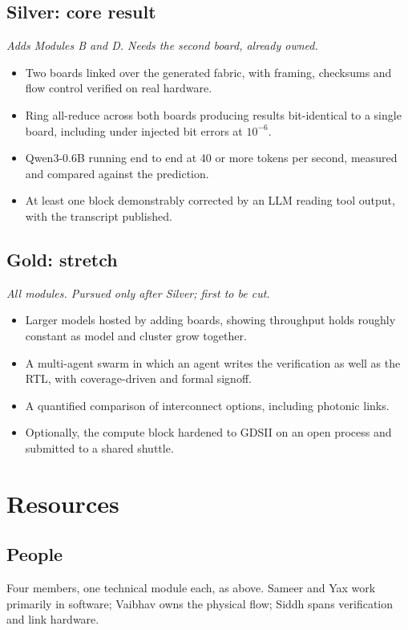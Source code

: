 \documentclass[conference,10pt]{IEEEtran}
\begin{document}
\subsection{Silver: core result}
\emph{Adds Modules B and D. Needs the second board, already owned.}
\begin{itemize}\itemsep1pt \parskip0pt
\item Two boards linked over the generated fabric, with framing, checksums and
flow control verified on real hardware.
\item Ring all-reduce across both boards producing results bit-identical to a
single board, including under injected bit errors at $10^{-6}$.
\item Qwen3-0.6B running end to end at 40 or more tokens per second, measured and
compared against the prediction.
\item At least one block demonstrably corrected by an LLM reading tool output,
with the transcript published.
\end{itemize}

\subsection{Gold: stretch}
\emph{All modules. Pursued only after Silver; first to be cut.}
\begin{itemize}\itemsep1pt \parskip0pt
\item Larger models hosted by adding boards, showing throughput holds roughly
constant as model and cluster grow together.
\item A multi-agent swarm in which an agent writes the verification as well as the
RTL, with coverage-driven and formal signoff.
\item A quantified comparison of interconnect options, including photonic links.
\item Optionally, the compute block hardened to GDSII on an open process and
submitted to a shared shuttle.
\end{itemize}

\section{Resources}
\subsection{People}
Four members, one technical module each, as above. Sameer and Yax work primarily in
software; Vaibhav owns the physical flow; Siddh spans verification and link
hardware.
\end{document}
